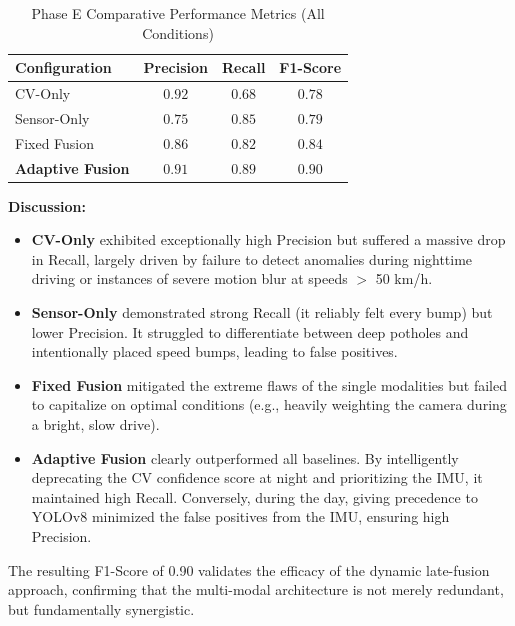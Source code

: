 \begin{table}[ht]
\centering
\caption{Phase E Comparative Performance Metrics (All Conditions)}
\label{tab:comparative_metrics}
\renewcommand{\arraystretch}{1.2}
\begin{tabular}{@{}lccc@{}}
\toprule
\textbf{Configuration} & \textbf{Precision} & \textbf{Recall} & \textbf{F1-Score} \\ \midrule
CV-Only & $0.92$ & $0.68$ & $0.78$ \\
Sensor-Only & $0.75$ & $0.85$ & $0.79$ \\
Fixed Fusion & $0.86$ & $0.82$ & $0.84$ \\
\textbf{Adaptive Fusion} & $\mathbf{0.91}$ & $\mathbf{0.89}$ & $\mathbf{0.90}$ \\ \bottomrule
\end{tabular}
\end{table}

\textbf{Discussion:}
\begin{itemize}
    \item \textbf{CV-Only} exhibited exceptionally high Precision but suffered a massive drop in Recall, largely driven by failure to detect anomalies during nighttime driving or instances of severe motion blur at speeds $>$ 50 km/h.
    \item \textbf{Sensor-Only} demonstrated strong Recall (it reliably felt every bump) but lower Precision. It struggled to differentiate between deep potholes and intentionally placed speed bumps, leading to false positives.
    \item \textbf{Fixed Fusion} mitigated the extreme flaws of the single modalities but failed to capitalize on optimal conditions (e.g., heavily weighting the camera during a bright, slow drive).
    \item \textbf{Adaptive Fusion} clearly outperformed all baselines. By intelligently deprecating the CV confidence score at night and prioritizing the IMU, it maintained high Recall. Conversely, during the day, giving precedence to YOLOv8 minimized the false positives from the IMU, ensuring high Precision.
\end{itemize}

The resulting F1-Score of 0.90 validates the efficacy of the dynamic late-fusion approach, confirming that the multi-modal architecture is not merely redundant, but fundamentally synergistic.

